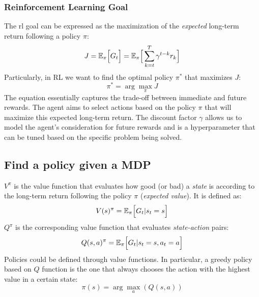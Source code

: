 \subsubsection*{Reinforcement Learning Goal}
The \ac{rl} goal can be expressed as the maximization of the \emph{expected} 
 long-term return following a policy $\pi$:
\begin{equation}
J = \mathbb{E_\pi}\Big[ G_t \Big] = \mathbb{E}_\pi \Big[ \sum_{k = t}^T \gamma^{t-k} r_k \Big] 
\end{equation}
Particularly, in \ac{RL} we want to find the optimal policy $\pi^*$ that maximizes $J$:
\begin{equation}
\pi^* = \arg \max_{\pi} J
\end{equation}
The equation essentially captures the trade-off between immediate and future rewards. 
 The agent aims to select actions based on the policy \(\pi\) 
 that will maximize this expected long-term return. 
 The discount factor \(\gamma\) allows us to model the agent's consideration 
 for future rewards and is a hyperparameter that can be tuned based on the specific problem being solved.

\subsection{Find a policy given a MDP}

$V^\pi$ is the value function that evaluates how good (or bad) a \emph{state} 
 is according to the long-term return following the policy $\pi$ (\emph{expected value}).
% 
It is defined as:
\begin{equation}
V(s)^\pi = \mathbb{E}_\pi \Big[ G_t | s_t = s \Big]
\end{equation}
$Q^\pi$ is the corresponding value function that evaluates \emph{state-action} pairs:
\begin{equation}
Q(s, a)^\pi = \mathbb{E}_\pi \Big[ G_t | s_t = s, a_t = a \Big]
\end{equation}
Policies could be defined through value functions. 
 In particular, a greedy policy based on $Q$ function is the one that always chooses 
 the action with the highest value in a certain state:
\begin{equation}
\pi(s) = \arg \max_{a}(Q(s, a))
\end{equation}
